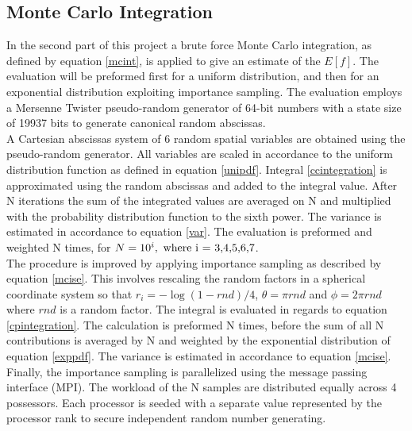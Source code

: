 \documentclass[%
reprint,nofootinbib,
amsmath,amssymb,
aps,
]{revtex4-1}
\begin{document}
\subsection{Monte Carlo Integration} \noindent 
In the second part of this project a brute force Monte Carlo integration, as defined by equation \ref{mcint}, is applied to give an estimate of the $E[f]$. The evaluation will be preformed first for a uniform distribution, and then for an exponential distribution exploiting importance sampling. The evaluation employs a Mersenne Twister pseudo-random generator of 64-bit numbers with a state size of 19937 bits to generate canonical random abscissas. \\ \indent A Cartesian abscissas system of 6 random spatial variables are obtained using the pseudo-random generator. All  variables are scaled in accordance to the uniform distribution function as defined in equation \ref{unipdf}. Integral \ref{ccintegration} is approximated using the random abscissas and added to the integral value. After N iterations the sum of the integrated values are averaged on N and multiplied with the probability distribution function to the sixth power. The variance is estimated in accordance to equation \ref{var}. The evaluation is preformed and weighted N times, for $N=10^i, \textnormal{ where i = 3,4,5,6,7}$.\\ \indent 
The procedure is improved by applying importance sampling as described by equation \ref{mcise}. This involves rescaling the random factors in a spherical coordinate system so that $r_i = -\log(1-rnd)/4$, $\theta = \pi rnd$ and $\phi = 2\pi rnd$ where $rnd$ is a random factor. The integral is evaluated in regards to equation \ref{cpintegration}. The calculation is preformed N times, before the sum of all N contributions is averaged by N and weighted by the exponential distribution of equation  \ref{exppdf}. The variance is estimated in accordance to equation \ref{mcise}. \\ \indent 
Finally, the importance sampling is parallelized using the message passing interface (MPI). The workload of the N samples are distributed equally across 4 possessors. Each processor is seeded with a separate value represented by the processor rank to secure independent random number generating.
\end{document}
